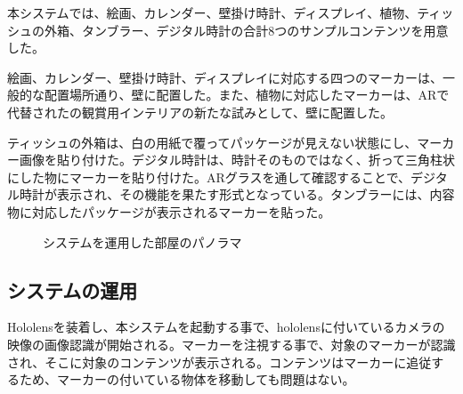 本システムでは、絵画、カレンダー、壁掛け時計、ディスプレイ、植物、ティッシュの外箱、タンブラー、デジタル時計の合計8つのサンプルコンテンツを用意した。

絵画、カレンダー、壁掛け時計、ディスプレイに対応する四つのマーカーは、一般的な配置場所通り、壁に配置した。また、植物に対応したマーカーは、ARで代替されたの観賞用インテリアの新たな試みとして、壁に配置した。

ティッシュの外箱は、白の用紙で覆ってパッケージが見えない状態にし、マーカー画像を貼り付けた。デジタル時計は、時計そのものではなく、折って三角柱状にした物にマーカーを貼り付けた。ARグラスを通して確認することで、デジタル時計が表示され、その機能を果たす形式となっている。タンブラーには、内容物に対応したパッケージが表示されるマーカーを貼った。

\begin{figure}[htbp]
  \begin{center}
  \end{center}
  \caption{システムを運用した部屋のパノラマ}
  \label{fig:sample1}
\end{figure}

\subsection{システムの運用}

Hololensを装着し、本システムを起動する事で、hololensに付いているカメラの映像の画像認識が開始される。マーカーを注視する事で、対象のマーカーが認識され、そこに対象のコンテンツが表示される。コンテンツはマーカーに追従するため、マーカーの付いている物体を移動しても問題はない。

